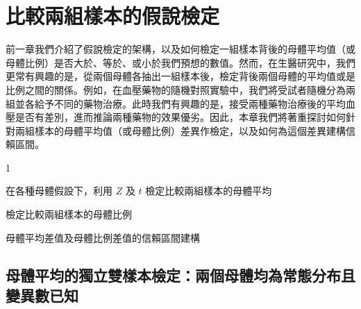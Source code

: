 \chapter{比較兩組樣本的假說檢定}

    前一章我們介紹了假說檢定的架構，以及如何檢定一組樣本背後的母體平均值（或母體比例）是否大於、等於、或小於我們預想的數值。然而，在生醫研究中，我們更常有興趣的是，從兩個母體各抽出一組樣本後，檢定背後兩個母體的平均值或是比例之間的關係。例如，在血壓藥物的隨機對照實驗中，我們將受試者隨機分為兩組並各給予不同的藥物治療。此時我們有興趣的是，接受兩種藥物治療後的平均血壓是否有差別，進而推論兩種藥物的效果優劣。因此，本章我們將著重探討如何針對兩組樣本的母體平均值（或母體比例）差異作檢定，以及如何為這個差異建構信賴區間。
    
    \begin{introduction}{1}
        \item 在各種母體假設下，利用 $Z$ 及 $t$ 檢定比較兩組樣本的母體平均
        \item 檢定比較兩組樣本的母體比例
        \item 母體平均差值及母體比例差值的信賴區間建構
    \end{introduction}

\section{母體平均的獨立雙樣本檢定：兩個母體均為常態分布且變異數已知}

